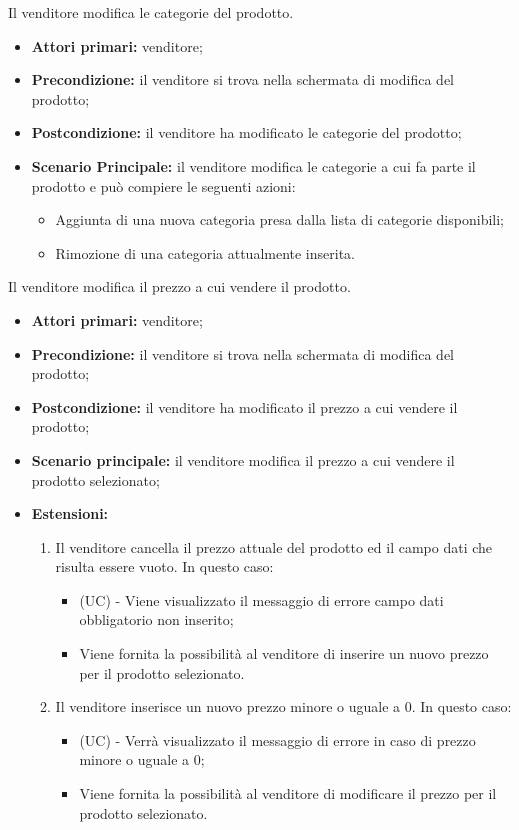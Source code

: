 Il venditore modifica le categorie del prodotto.
\begin{itemize}
    \item \textbf{Attori primari:} venditore;
    \item \textbf{Precondizione:} il venditore si trova nella schermata di modifica del prodotto;
    \item \textbf{Postcondizione:} il venditore ha modificato le categorie del prodotto;
    \item \textbf{Scenario Principale:} il venditore modifica le categorie a cui fa parte il prodotto e può compiere le seguenti azioni:
    \begin{itemize}
        \item Aggiunta di una nuova categoria presa dalla lista di categorie disponibili;
        \item Rimozione di una categoria attualmente inserita.
    \end{itemize}
\end{itemize}

Il venditore modifica il prezzo a cui vendere il prodotto.
\begin{itemize}
    \item \textbf{Attori primari:} venditore;
    \item \textbf{Precondizione:} il venditore si trova nella schermata di modifica del prodotto;
    \item \textbf{Postcondizione:} il venditore ha modificato il prezzo a cui vendere il prodotto;
    \item \textbf{Scenario principale:} il venditore modifica il prezzo a cui vendere il prodotto selezionato;
    \item \textbf{Estensioni:}
    \begin{enumerate}[label=\lett]
    	\item Il venditore cancella il prezzo attuale del prodotto ed il campo dati che risulta essere vuoto. In questo caso:
    	\begin{itemize}
    		\item (UC) - Viene visualizzato il messaggio di errore campo dati obbligatorio non inserito;
    		\item Viene fornita la possibilità al venditore di inserire un nuovo prezzo per il prodotto selezionato.
    	\end{itemize}
    	\item Il venditore inserisce un nuovo prezzo minore o uguale a 0. In questo caso:
    	\begin{itemize}
    		\item (UC) - Verrà visualizzato il messaggio di errore in caso di prezzo minore o uguale a 0;
    		\item Viene fornita la possibilità al venditore di modificare il prezzo per il prodotto selezionato.
    	\end{itemize}
    \end{enumerate}
\end{itemize}

